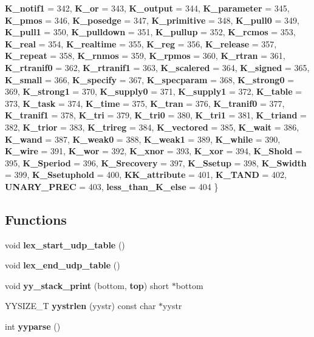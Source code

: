 \begin{CompactItemize}
{\bf K\_\-notif1} =  342, 
{\bf K\_\-or} =  343, 
{\bf K\_\-output} =  344, 
{\bf K\_\-parameter} =  345, 
{\bf K\_\-pmos} =  346, 
{\bf K\_\-posedge} =  347, 
{\bf K\_\-primitive} =  348, 
{\bf K\_\-pull0} =  349, 
{\bf K\_\-pull1} =  350, 
{\bf K\_\-pulldown} =  351, 
{\bf K\_\-pullup} =  352, 
{\bf K\_\-rcmos} =  353, 
{\bf K\_\-real} =  354, 
{\bf K\_\-realtime} =  355, 
{\bf K\_\-reg} =  356, 
{\bf K\_\-release} =  357, 
{\bf K\_\-repeat} =  358, 
{\bf K\_\-rnmos} =  359, 
{\bf K\_\-rpmos} =  360, 
{\bf K\_\-rtran} =  361, 
{\bf K\_\-rtranif0} =  362, 
{\bf K\_\-rtranif1} =  363, 
{\bf K\_\-scalered} =  364, 
{\bf K\_\-signed} =  365, 
{\bf K\_\-small} =  366, 
{\bf K\_\-specify} =  367, 
{\bf K\_\-specparam} =  368, 
{\bf K\_\-strong0} =  369, 
{\bf K\_\-strong1} =  370, 
{\bf K\_\-supply0} =  371, 
{\bf K\_\-supply1} =  372, 
{\bf K\_\-table} =  373, 
{\bf K\_\-task} =  374, 
{\bf K\_\-time} =  375, 
{\bf K\_\-tran} =  376, 
{\bf K\_\-tranif0} =  377, 
{\bf K\_\-tranif1} =  378, 
{\bf K\_\-tri} =  379, 
{\bf K\_\-tri0} =  380, 
{\bf K\_\-tri1} =  381, 
{\bf K\_\-triand} =  382, 
{\bf K\_\-trior} =  383, 
{\bf K\_\-trireg} =  384, 
{\bf K\_\-vectored} =  385, 
{\bf K\_\-wait} =  386, 
{\bf K\_\-wand} =  387, 
{\bf K\_\-weak0} =  388, 
{\bf K\_\-weak1} =  389, 
{\bf K\_\-while} =  390, 
{\bf K\_\-wire} =  391, 
{\bf K\_\-wor} =  392, 
{\bf K\_\-xnor} =  393, 
{\bf K\_\-xor} =  394, 
{\bf K\_\-Shold} =  395, 
{\bf K\_\-Speriod} =  396, 
{\bf K\_\-Srecovery} =  397, 
{\bf K\_\-Ssetup} =  398, 
{\bf K\_\-Swidth} =  399, 
{\bf K\_\-Ssetuphold} =  400, 
{\bf KK\_\-attribute} =  401, 
{\bf K\_\-TAND} =  402, 
{\bf UNARY\_\-PREC} =  403, 
{\bf less\_\-than\_\-K\_\-else} =  404
 \}
\end{CompactItemize}
\subsection*{Functions}
\begin{CompactItemize}
\item 
void {\bf lex\_\-start\_\-udp\_\-table} ()
\item 
void {\bf lex\_\-end\_\-udp\_\-table} ()
\item 
void {\bf yy\_\-stack\_\-print} (bottom, {\bf top}) short $\ast$bottom
\item 
YYSIZE\_\-T {\bf yystrlen} (yystr) const char $\ast$yystr
\item 
int {\bf yyparse} ()
\end{CompactItemize}
